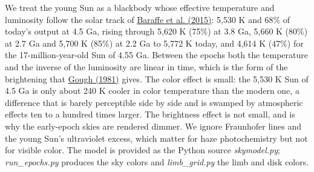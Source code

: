 \documentclass[9pt,twocolumn]{extarticle}
\begin{document}
We treat the young Sun as a blackbody whose effective temperature and luminosity follow the solar track of \protect\hyperlink{cite.baraffe2015}{Baraffe et al. (2015)}: 5,530 K and 68\% of today's output at 4.5 Ga, rising through 5,620 K (75\%) at 3.8 Ga, 5,660 K (80\%) at 2.7 Ga and 5,700 K (85\%) at 2.2 Ga to 5,772 K today, and 4,614 K (47\%) for the 17-million-year-old Sun of 4.55 Ga. Between the epochs both the temperature and the inverse of the luminosity are linear in time, which is the form of the brightening that \protect\hyperlink{cite.gough1981}{Gough (1981)} gives. The color effect is small: the 5,530 K Sun of 4.5 Ga is only about 240 K cooler in color temperature than the modern one, a difference that is barely perceptible side by side and is swamped by atmospheric effects ten to a hundred times larger. The brightness effect is not small, and is why the early-epoch skies are rendered dimmer. We ignore Fraunhofer lines and the young Sun's ultraviolet excess, which matter for haze photochemistry but not for visible color. The model is provided as the Python source \emph{skymodel.py}; \emph{run\_epochs.py} produces the sky colors and \emph{limb\_grid.py} the limb and disk colors.
\end{document}
